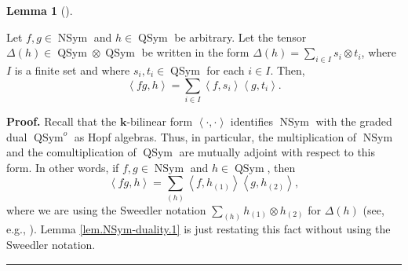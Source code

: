\documentclass[numbers=enddot,12pt,final,onecolumn,notitlepage]{scrartcl}%
\theoremstyle{definition}
\newtheorem{lem}[theo]{Lemma}
\newenvironment{lemma}[1][]
{\begin{lem}[#1]\begin{leftbar}}
{\end{leftbar}\end{lem}}
\newenvironment{proof}[1][Proof]{\noindent\textbf{#1.} }{\ \rule{0.5em}{0.5em}}
\let\sumnonlimits\sum
\renewcommand{\sum}{\sumnonlimits\limits}
\begin{document}
\begin{lemma}
\label{lem.NSym-duality.1}Let $f,g\in\operatorname*{NSym}$ and $h\in
\operatorname*{QSym}$ be arbitrary. Let the tensor $\Delta\left(  h\right)
\in\operatorname*{QSym}\otimes\operatorname*{QSym}$ be written in the form
$\Delta\left(  h\right)  =\sum_{i\in I}s_{i}\otimes t_{i}$, where $I$ is a
finite set and where $s_{i},t_{i}\in\operatorname*{QSym}$ for each $i\in I$.
Then,%
\[
\left\langle fg,h\right\rangle =\sum_{i\in I}\left\langle f,s_{i}\right\rangle
\left\langle g,t_{i}\right\rangle .
\]

\end{lemma}

\begin{proof}
Recall that the $\mathbf{k}$-bilinear form $\left\langle \cdot,\cdot
\right\rangle $ identifies $\operatorname*{NSym}$ with the graded dual
$\operatorname*{QSym}\nolimits^{o}$ as Hopf algebras. Thus, in particular, the
multiplication of $\operatorname*{NSym}$ and the comultiplication of
$\operatorname*{QSym}$ are mutually adjoint with respect to this form. In
other words, if $f,g\in\operatorname*{NSym}$ and $h\in\operatorname*{QSym}$,
then%
\[
\left\langle fg,h\right\rangle =\sum_{\left(  h\right)  }\left\langle
f,h_{\left(  1\right)  }\right\rangle \left\langle g,h_{\left(  2\right)
}\right\rangle ,
\]
where we are using the Sweedler notation $\sum_{\left(  h\right)  }h_{\left(
1\right)  }\otimes h_{\left(  2\right)  }$ for $\Delta\left(  h\right)  $
(see, e.g., \cite[(1.2.3)]{GriRei}). Lemma \ref{lem.NSym-duality.1} is just
restating this fact without using the Sweedler notation.
\end{proof}
\end{document}
